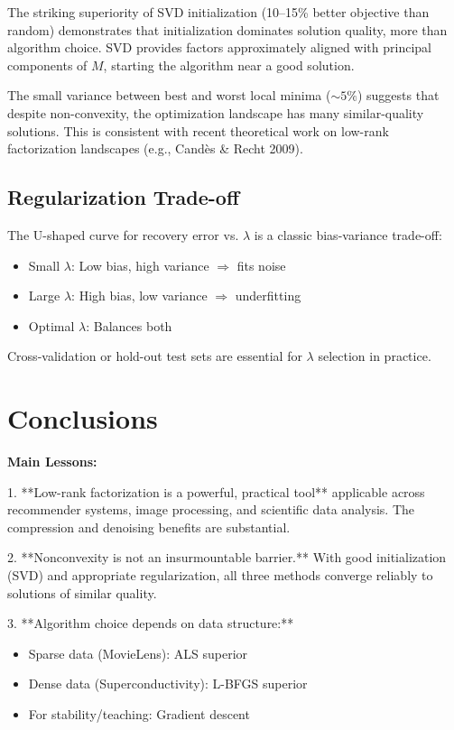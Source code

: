 \documentclass[11pt,a4paper]{article}
\begin{document}
The striking superiority of SVD initialization (10--15\% better objective than random) demonstrates that initialization dominates solution quality, more than algorithm choice. SVD provides factors approximately aligned with principal components of $M$, starting the algorithm near a good solution.

The small variance between best and worst local minima ($\sim 5\%$) suggests that despite non-convexity, the optimization landscape has many similar-quality solutions. This is consistent with recent theoretical work on low-rank factorization landscapes (e.g., Candès \& Recht 2009).

\subsection{Regularization Trade-off}

The U-shaped curve for recovery error vs. $\lambda$ is a classic bias-variance trade-off:
\begin{itemize}
  \item Small $\lambda$: Low bias, high variance $\Rightarrow$ fits noise
  \item Large $\lambda$: High bias, low variance $\Rightarrow$ underfitting
  \item Optimal $\lambda$: Balances both
\end{itemize}

Cross-validation or hold-out test sets are essential for $\lambda$ selection in practice.

\section{Conclusions}

\textbf{Main Lessons:}

1. **Low-rank factorization is a powerful, practical tool** applicable across recommender systems, image processing, and scientific data analysis. The compression and denoising benefits are substantial.

2. **Nonconvexity is not an insurmountable barrier.** With good initialization (SVD) and appropriate regularization, all three methods converge reliably to solutions of similar quality.

3. **Algorithm choice depends on data structure:**
   \begin{itemize}
     \item Sparse data (MovieLens): ALS superior
     \item Dense data (Superconductivity): L-BFGS superior
     \item For stability/teaching: Gradient descent
   \end{itemize}
\end{document}
